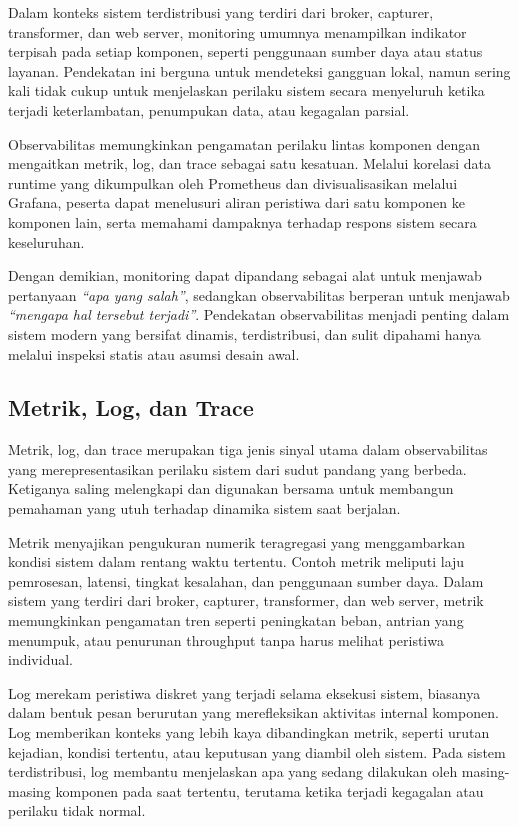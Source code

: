 Dalam konteks sistem terdistribusi yang terdiri dari broker, capturer, transformer, dan web server, monitoring umumnya menampilkan indikator terpisah pada setiap komponen, seperti penggunaan sumber daya atau status layanan. Pendekatan ini berguna untuk mendeteksi gangguan lokal, namun sering kali tidak cukup untuk menjelaskan perilaku sistem secara menyeluruh ketika terjadi keterlambatan, penumpukan data, atau kegagalan parsial.

Observabilitas memungkinkan pengamatan perilaku lintas komponen dengan mengaitkan metrik, log, dan trace sebagai satu kesatuan. Melalui korelasi data runtime yang dikumpulkan oleh Prometheus dan divisualisasikan melalui Grafana, peserta dapat menelusuri aliran peristiwa dari satu komponen ke komponen lain, serta memahami dampaknya terhadap respons sistem secara keseluruhan.

Dengan demikian, monitoring dapat dipandang sebagai alat untuk menjawab pertanyaan \emph{``apa yang salah''}, sedangkan observabilitas berperan untuk menjawab \emph{``mengapa hal tersebut terjadi''}. Pendekatan observabilitas menjadi penting dalam sistem modern yang bersifat dinamis, terdistribusi, dan sulit dipahami hanya melalui inspeksi statis atau asumsi desain awal.

\subsection{Metrik, Log, dan Trace}

Metrik, log, dan trace merupakan tiga jenis sinyal utama dalam observabilitas yang merepresentasikan perilaku sistem dari sudut pandang yang berbeda. Ketiganya saling melengkapi dan digunakan bersama untuk membangun pemahaman yang utuh terhadap dinamika sistem saat berjalan.

Metrik menyajikan pengukuran numerik teragregasi yang menggambarkan kondisi sistem dalam rentang waktu tertentu. Contoh metrik meliputi laju pemrosesan, latensi, tingkat kesalahan, dan penggunaan sumber daya. Dalam sistem yang terdiri dari broker, capturer, transformer, dan web server, metrik memungkinkan pengamatan tren seperti peningkatan beban, antrian yang menumpuk, atau penurunan throughput tanpa harus melihat peristiwa individual.

Log merekam peristiwa diskret yang terjadi selama eksekusi sistem, biasanya dalam bentuk pesan berurutan yang merefleksikan aktivitas internal komponen. Log memberikan konteks yang lebih kaya dibandingkan metrik, seperti urutan kejadian, kondisi tertentu, atau keputusan yang diambil oleh sistem. Pada sistem terdistribusi, log membantu menjelaskan apa yang sedang dilakukan oleh masing-masing komponen pada saat tertentu, terutama ketika terjadi kegagalan atau perilaku tidak normal.

